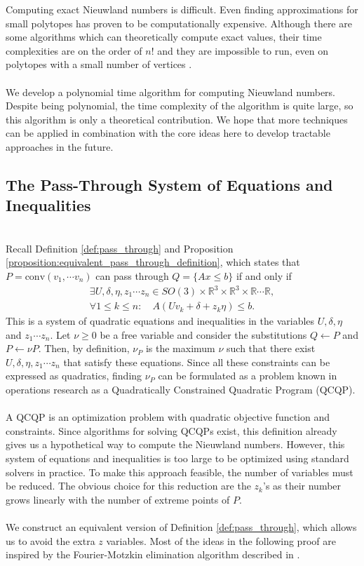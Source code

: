 \documentclass[a4paper]{amsart}
\theoremstyle{remark}
\begin{document}
Computing exact Nieuwland numbers is difficult. Even finding approximations for small polytopes has proven to be computationally expensive. Although there are some algorithms which can theoretically compute exact values, their time complexities are on the order of $n!$ and they are impossible to run, even on polytopes with a small number of vertices \cite{StYu23}.\\\\
We develop a polynomial time algorithm for computing Nieuwland numbers. Despite being polynomial, the time complexity of the algorithm is quite large, so this algorithm is only a theoretical contribution. We hope that more techniques can be applied in combination with the core ideas here to develop tractable approaches in the future.
\\
\subsection{The Pass-Through System of Equations and Inequalities} \label{subsec:pass_through}
\hfill \\
Recall Definition \ref{def:pass_through} and Proposition \ref{proposition:equivalent_pass_through_definition}, which states that $P=\textrm{conv}(v_1, \cdots v_n)$ can pass through $Q = \{Ax \leq b\}$ if and only if
\begin{gather*}
	\exists U,\delta,\eta, z_1 \cdots z_n \in SO(3)\times \mathbb{R}^3\times\mathbb{R}^3\times \mathbb{R} \cdots \mathbb{R},\\
	\forall 1\leq k \leq n: \quad A(Uv_k+\delta+z_k\eta) \leq b.
\end{gather*}
This is a system of quadratic equations and inequalities in the variables $U, \delta, \eta$ and $z_1 \cdots z_n$. Let $\nu \geq 0$ be a free variable and consider the substitutions $Q \leftarrow P$ and $P \leftarrow \nu P$. Then, by definition, $\nu_P$ is the maximum $\nu$ such that there exist $U, \delta, \eta, z_1 \cdots z_n$ that satisfy these equations. Since all these constraints can be expressed as quadratics, finding $\nu_P$ can be formulated as a problem known in operations research as a Quadratically Constrained Quadratic Program (QCQP).\\\\
A QCQP is an optimization problem with quadratic objective function and constraints. Since algorithms for solving QCQPs exist, this definition already gives us a hypothetical way to compute the Nieuwland numbers. However, this system of equations and inequalities is too large to be optimized using standard solvers in practice. To make this approach feasible, the number of variables must be reduced. The obvious choice for this reduction are the $z_k$'s as their number grows linearly with the number of extreme points of $P$.\\\\
We construct an equivalent version of Definition \ref{def:pass_through}, which allows us to avoid the extra $z$ variables. Most of the ideas in the following proof are inspired by the Fourier-Motzkin elimination algorithm described in \cite{ConCorZam14}. 
\end{document}
